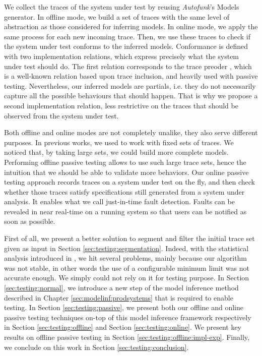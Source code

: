 We collect the traces of the system under test by reusing
\textit{Autofunk}'s Models generator. In offline mode, we build a set of
traces with the same level of abstraction as those considered for
inferring models. In online mode, we apply the same process for
each new incoming trace. Then, we use these traces to check if
the system under test conforms to the inferred models.
Conformance is defined with two implementation relations, which
express precisely what the system under test should do. The first
relation corresponds to the trace preoder \cite{DNH84}, which is
a well-known relation based upon trace inclusion, and heavily
used with passive testing.  Nevertheless, our inferred models are
partials, i.e.  they do not necessarily capture all the possible
behaviours that should happen. That is why we propose a second
implementation relation, less restrictive on the traces that
should be observed from the system under test.

Both offline and online modes are not completely unalike, they
also serve different purposes. In previous works, we used to work
with fixed sets of traces. We noticed that, by taking large sets,
we could build more complete models. Performing offline passive
testing allows to use such large trace sets, hence the intuition
that we should be able to validate more behaviors. Our online
passive testing approach records traces on a system under test on
the fly, and then check whether those traces satisfy
specifications still generated from a system under analysis. It
enables what we call just-in-time fault detection. Faults can be
revealed in near real-time on a running system so that users can
be notified as soon as possible.

First of all, we present a better solution to segment and filter
the initial trace set given as input in Section
\ref{sec:testing:segmentation}. Indeed, with the statistical
analysis introduced in
,
we hit several problems, mainly because our algorithm was not
stable, in other words the use of a configurable minimum limit
was not accurate enough. We simply could not rely on it for
testing purpose.  In Section \ref{sec:testing:normal}, we
introduce a new step of the model inference method described in
Chapter \ref{sec:modelinf:prodsystems} that is required to enable
testing. In Section \ref{sec:testing:passive}, we present both
our offline and online passive testing techniques on-top of this
model inference framework respectively in Section
\ref{sec:testing:offline} and Section \ref{sec:testing:online}.
We present key results on offline passive testing in Section
\ref{sec:testing:offline:impl-exp}.  Finally, we conclude on this
work in Section \ref{sec:testing:conclusion}.

